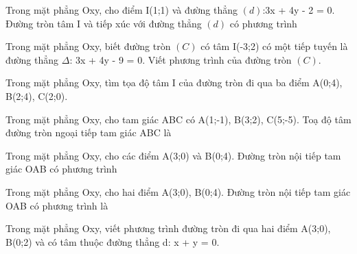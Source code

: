 \documentclass[12pt,a4paper]{book}
\begin{document}
\begin{ex}
Trong mặt phẳng Oxy, cho điểm I(1;1) và đường thẳng $(d)$:3x + 4y - 2 = 0. Đường tròn tâm I và tiếp xúc với đường thẳng $(d)$ có phương trình
\loigiai{}
\end{ex}

\begin{ex}
Trong mặt phẳng Oxy, biết đường tròn $(C)$ có tâm I(-3;2) có một tiếp tuyến là đường thẳng $\Delta$: 3x + 4y - 9 = 0. Viết phương trình của đường tròn $(C)$.
\loigiai{}
\end{ex}

\begin{ex}
Trong mặt phẳng Oxy, tìm tọa độ tâm I của đường tròn đi qua ba điểm A(0;4), B(2;4), C(2;0).
\loigiai{}
\end{ex}

\begin{ex}
Trong mặt phẳng Oxy, cho tam giác ABC có A(1;-1), B(3;2), C(5;-5). Toạ độ tâm đường tròn ngoại tiếp tam giác ABC là
\loigiai{}
\end{ex}

\begin{ex}
Trong mặt phẳng Oxy, cho các điểm A(3;0) và B(0;4). Đường tròn nội tiếp tam giác OAB có phương trình
\loigiai{}
\end{ex}

\begin{ex}
Trong mặt phẳng Oxy, cho hai điểm A(3;0), B(0;4). Đường tròn nội tiếp tam giác OAB có phương trình là
\loigiai{}
\end{ex}

\begin{ex}
Trong mặt phẳng Oxy, viết phương trình đường tròn đi qua hai điểm A(3;0), B(0;2) và có tâm thuộc đường thẳng d: x + y = 0.
\loigiai{}
\end{ex}
\end{document}
